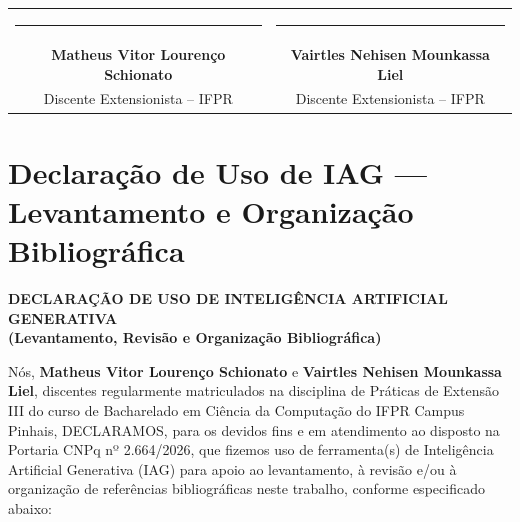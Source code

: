 \bigskip\bigskip
\noindent
\begin{center}
\begin{tabular}{cc}
\rule{6.5cm}{0.5pt} & \rule{6.5cm}{0.5pt} \\
\textbf{Matheus Vitor Lourenço Schionato} & \textbf{Vairtles Nehisen Mounkassa Liel} \\
Discente Extensionista -- IFPR & Discente Extensionista -- IFPR \\
\end{tabular}
\end{center}

\bigskip
\begin{center}
\end{center}


\newpage
\section{Declaração de Uso de IAG --- Levantamento e Organização Bibliográfica}
\label{ap:declaracao_revisao_bibliografia}

\begin{center}
\textbf{\large DECLARAÇÃO DE USO DE INTELIGÊNCIA ARTIFICIAL GENERATIVA}\\
\textbf{(Levantamento, Revisão e Organização Bibliográfica)}
\end{center}

\bigskip
\noindent
Nós, \textbf{Matheus Vitor Lourenço Schionato} e \textbf{Vairtles Nehisen Mounkassa Liel}, discentes regularmente matriculados na disciplina de Práticas de Extensão III do curso de Bacharelado em Ciência da Computação do IFPR Campus Pinhais, DECLARAMOS, para os devidos fins e em atendimento ao disposto na Portaria CNPq nº 2.664/2026, que fizemos uso de ferramenta(s) de Inteligência Artificial Generativa (IAG) para apoio ao levantamento, à revisão e/ou à organização de referências bibliográficas neste trabalho, conforme especificado abaixo:

